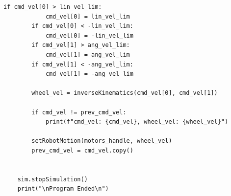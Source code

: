 \documentclass{article}
\begin{document}
\begin{lstlisting}[style=matlabstyle]
        if cmd_vel[0] > lin_vel_lim:
            cmd_vel[0] = lin_vel_lim
        if cmd_vel[0] < -lin_vel_lim:
            cmd_vel[0] = -lin_vel_lim
        if cmd_vel[1] > ang_vel_lim:
            cmd_vel[1] = ang_vel_lim
        if cmd_vel[1] < -ang_vel_lim:
            cmd_vel[1] = -ang_vel_lim 
        
        wheel_vel = inverseKinematics(cmd_vel[0], cmd_vel[1])
        
        if cmd_vel != prev_cmd_vel:
            print(f"cmd_vel: {cmd_vel}, wheel_vel: {wheel_vel}")
        
        setRobotMotion(motors_handle, wheel_vel)
        prev_cmd_vel = cmd_vel.copy()
    
    
    sim.stopSimulation()
    print("\nProgram Ended\n")
\end{lstlisting}
  
\end{document}
